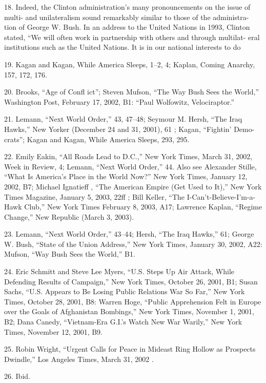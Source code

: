 	{\color{blue}18}. Indeed, the Clinton administration’s many pronouncements on the issue of multi- and unilateralism sound remarkably similar to those of the administra- tion of George W. Bush. In an address to the United Nations in 1993, Clinton stated, “We will often work in partnership with others and through multilat- eral institutions such as the United Nations. It is in our national interests to do


	{\color{blue}19}. Kagan and Kagan, While America Sleeps, 1–2, 4; Kaplan, Coming Anarchy, 157, 172, 176.


	{\color{blue}20}. Brooks, “Age of Confl ict”; Steven Mufson, “The Way Bush Sees the World,” Washington Post, February 17, 2002, B1: “Paul Wolfowitz, Velociraptor.”


	{\color{blue}21}. Lemann, “Next World Order,” 43, 47–48; Seymour M. Hersh, “The Iraq Hawks,” New Yorker (December 24 and 31, 2001), 61 ; Kagan, “Fightin’ Demo- crats”; Kagan and Kagan, While America Sleeps, 293, 295.


	{\color{blue}22}. Emily Eakin, “All Roads Lead to D.C.,” New York Times, March 31, 2002, Week in Review, 4; Lemann, “Next World Order,” 44. Also see Alexander Stille, “What Is America’s Place in the World Now?” New York Times, January 12, 2002, B7; Michael Ignatieff , “The American Empire (Get Used to It),” New York Times Magazine, January 5, 2003, 22ff ; Bill Keller, “The I-Can’t-Believe-I’m-a- Hawk Club,” New York Times February 8, 2003, A17; Lawrence Kaplan, “Regime Change,” New Republic (March 3, 2003).


	{\color{blue}23}. Lemann, “Next World Order,” 43–44; Hersh, “The Iraq Hawks,” 61; George W. Bush, “State of the Union Address,” New York Times, January 30, 2002, A22: Mufson, “Way Bush Sees the World,” B1.


	{\color{blue}24}. Eric Schmitt and Steve Lee Myers, “U.S. Steps Up Air Attack, While Defending Results of Campaign,” New York Times, October 26, 2001, B1; Susan Sachs, “U.S. Appears to Be Losing Public Relations War So Far,” New York Times, October 28, 2001, B8: Warren Hoge, “Public Apprehension Felt in Europe over the Goals of Afghanistan Bombings,” New York Times, November 1, 2001, B2; Dana Canedy, “Vietnam-Era G.I.’s Watch New War Warily,” New York Times, November 12, 2001, B9.


	{\color{blue}25}. Robin Wright, “Urgent Calls for Peace in Mideast Ring Hollow as Prospects Dwindle,” Los Angeles Times, March 31, 2002 .


	{\color{blue}26}. Ibid.


